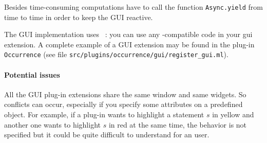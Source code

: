Besides time-consuming computations have to call the function
\texttt{Async.yield} from time to time in order to keep the GUI reactive.

The GUI implementation uses
\lablgtk~\cite{lablgtk}: you can use any \lablgtk-compatible
code in your gui extension. A complete example of a GUI extension may be found in
the plug-in \texttt{Occurrence} (see file
\texttt{src/plugins/occurrence/gui/register\_gui.ml}).

\begin{important}
\paragraph{Potential issues}
All the GUI plug-in extensions share the same window and same
widgets. So conflicts can occur, especially if you
specify some attributes on a predefined object. For example, if a plug-in wants
to highlight a statement $s$ in yellow and another one
wants to highlight $s$ in red at the same time, the behavior is not specified
but it could be quite difficult to understand for an user.
\end{important}







